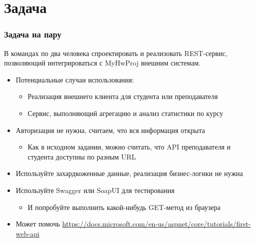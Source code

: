 \documentclass[xetex,mathserif,serif]{beamer}
\begin{document}
    \section{Задача}

    \begin{frame}
        \frametitle{Задача на пару}
        В командах по два человека спроектировать и реализовать REST-сервис, позволяющий интегрироваться с MyHwProj внешним системам.
        \begin{itemize}
            \item Потенциальные случаи использования:
            \begin{itemize}
                \item Реализация внешнего клиента для студента или преподавателя
                \item Сервис, выполняющий агрегацию и анализ статистики по курсу
            \end{itemize}
            \item Авторизация не нужна, считаем, что вся информация открыта
            \begin{itemize}
                \item Как в исходном задании, можно считать, что API преподавателя и студента доступны по разным URL
            \end{itemize}
            \item Используйте захардкоженные данные, реализация бизнес-логики не нужна
            \item Используйте Swagger или SoapUI для тестирования
            \begin{itemize}
                \item И попробуйте выполнить какой-нибудь GET-метод из браузера
            \end{itemize}
            \item Может помочь \url{https://docs.microsoft.com/en-us/aspnet/core/tutorials/first-web-api}
        \end{itemize}
    \end{frame}
\end{document}
